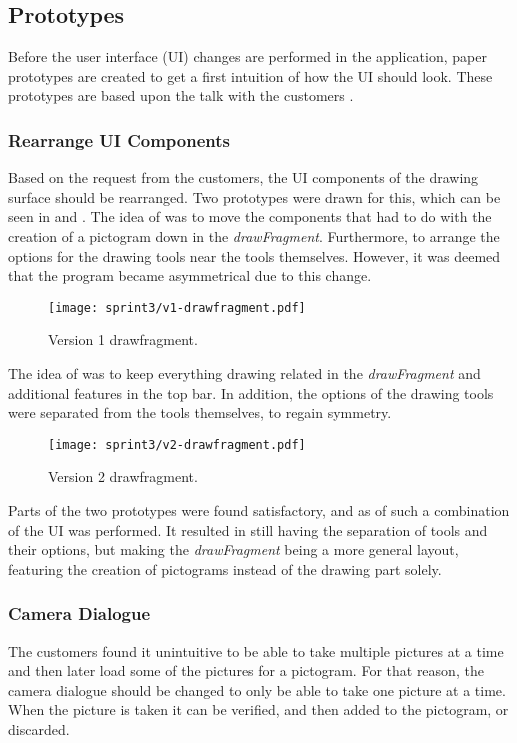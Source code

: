 \subsection{Prototypes}
Before the user interface (UI) changes are performed in the application, paper prototypes are created to get a first intuition of how the UI should look.
These prototypes are based upon the talk with the customers \citep{misc:drazenko, misc:pernille}.
 
\subsubsection*{Rearrange UI Components}
Based on the request from the customers, the UI components of the drawing surface should be rearranged.
Two prototypes were drawn for this, which can be seen in  and .
The idea of  was to move the components that had to do with the creation of a pictogram down in the \textit{drawFragment}. Furthermore, to arrange the options for the drawing tools near the tools themselves.
However, it was deemed that the program became asymmetrical due to this change.

\begin{figure}[h]
     \centering
     \texttt{[image: sprint3/v1-drawfragment.pdf]}
     \caption{Version 1 drawfragment.}
     \label{fig:v1drawfrag}
\end{figure}

The idea of  was to keep everything drawing related in the \textit{drawFragment} and additional features in the top bar. In addition, the options of the drawing tools were separated from the tools themselves, to regain symmetry.

\begin{figure}[h]
     \centering
     \texttt{[image: sprint3/v2-drawfragment.pdf]}
     \caption{Version 2 drawfragment.}
     \label{fig:v2drawfrag}
\end{figure}

Parts of the two prototypes were found satisfactory, and as of such a combination of the UI was performed.
It resulted in still having the separation of tools and their options, but making the \textit{drawFragment} being a more general layout, featuring the creation of pictograms instead of the drawing part solely.

\subsubsection*{Camera Dialogue}
The customers found it unintuitive to be able to take multiple pictures at a time and then later load some of the pictures for a pictogram.
For that reason, the camera dialogue should be changed to only be able to take one picture at a time.
When the picture is taken it can be verified, and then added to the pictogram, or discarded.

